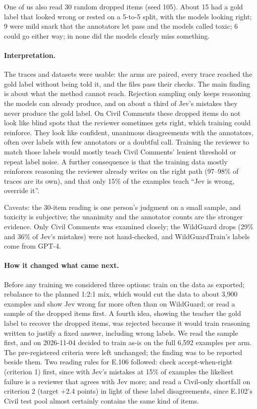 \documentclass[11pt]{article}
\renewcommand{\_}{\origunderscore\allowbreak}
\begin{document}
One of us also read 30 random dropped items (seed 105). About 15 had a gold label that looked wrong or rested on a 5-to-5 split, with the models looking right; 9 were mild snark that the annotators let pass and the models called toxic; 6 could go either way; in none did the models clearly miss something.

\paragraph{Interpretation.}
The traces and datasets were usable: the arms are paired, every trace reached the gold label without being told it, and the files pass their checks. The main finding is about what the method cannot reach. Rejection sampling only keeps reasoning the models can already produce, and on about a third of Jev's mistakes they never produce the gold label. On Civil Comments these dropped items do not look like blind spots that the reviewer sometimes gets right, which training could reinforce. They look like confident, unanimous disagreements with the annotators, often over labels with few annotators or a doubtful call. Training the reviewer to match those labels would mostly teach Civil Comments' lenient threshold or repeat label noise. A further consequence is that the training data mostly reinforces reasoning the reviewer already writes on the right path (97--98\% of traces are its own), and that only 15\% of the examples teach ``Jev is wrong, override it''.

Caveats: the 30-item reading is one person's judgment on a small sample, and toxicity is subjective; the unanimity and the annotator counts are the stronger evidence. Only Civil Comments was examined closely; the WildGuard drops (29\% and 36\% of Jev's mistakes) were not hand-checked, and WildGuardTrain's labels come from GPT-4.

\paragraph{How it changed what came next.}
Before any training we considered three options: train on the data as exported; rebalance to the planned 1:2:1 mix, which would cut the data to about 3,900 examples and show Jev wrong far more often than on WildGuard; or read a sample of the dropped items first. A fourth idea, showing the teacher the gold label to recover the dropped items, was rejected because it would train reasoning written to justify a fixed answer, including wrong labels. We read the sample first, and on 2026-11-04 decided to train as-is on the full 6,592 examples per arm. The pre-registered criteria were left unchanged; the finding was to be reported beside them. Two reading rules for E.106 followed: check accept-when-right (criterion 1) first, since with Jev's mistakes at 15\% of examples the likeliest failure is a reviewer that agrees with Jev more; and read a Civil-only shortfall on criterion 2 (target +2.4 points) in light of these label disagreements, since E.102's Civil test pool almost certainly contains the same kind of items.
\end{document}
